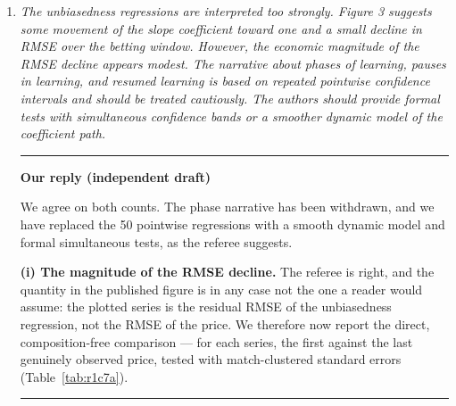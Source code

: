 \documentclass[letterpaper,12pt]{article}
\newcounter{b}
\newcommand{\Reply}[1]{\par\noindent\textbf{Reply:} #1}
\newenvironment{ourreply}
  {\par\medskip\noindent\textcolor{ourcol}{\rule{\linewidth}{1pt}}%
   \par\nobreak\vspace{3pt}%
   \noindent\textbf{\textcolor{ourcol}{Our reply (independent draft)}}%
   \par\nobreak\vspace{3pt}}
  {\par\vspace{3pt}%
   \noindent\textcolor{ourcol}{\rule{\linewidth}{0.4pt}}\par\medskip}
\begin{document}
\begin{enumerate}
\Reply{We agree that the Biais et al. (1999) framework was developed for an asymptotic, continuous, unbounded financial-market setting, whereas we apply it to a finite-horizon, binary-outcome market with irregularly spaced, margin-contaminated prices, and we will add a paragraph to Section~3.5 (Learning Rate) discussing these differences explicitly. Two features of the framework make it more portable to our setting than it may first appear. First, the moment conditions (Equation~9 in the manuscript) are constructed so that $\sigma^2$ cancels, making them robust to heteroskedasticity across time and matches -- precisely the property we need given our irregular observation grid and time-varying margins. Second, as we note following that equation, the moment conditions are invariant to a rescaling of $t$, which mitigates concerns about the arbitrary choice of a time origin in a finite-horizon market. We will clarify in the revised text that we interpret $\hat{\gamma}$ as a reduced-form measure of how quickly the price-outcome gap shrinks over our \emph{observed} window, rather than as a literal estimate of an asymptotic convergence rate, and will flag the transfer of an asymptotic framework to a finite window as an acknowledged limitation, consistent with how we already treat the comparison to Biais et al.'s and Vives's (1995) financial-market estimates as suggestive rather than directly comparable (Section~5.5).}

\item \textit{The unbiasedness regressions are interpreted too strongly. Figure 3 suggests some
movement of the slope coefficient toward one and a small decline in RMSE over the
betting window. However, the economic magnitude of the RMSE decline appears
modest. The narrative about phases of learning, pauses in learning, and resumed
learning is based on repeated pointwise confidence intervals and should be treated
cautiously. The authors should provide formal tests with simultaneous confidence
bands or a smoother dynamic model of the coefficient path. }

\begin{ourreply}
We agree on both counts. The phase narrative has been withdrawn, and we have
replaced the 50 pointwise regressions with a smooth dynamic model and formal
simultaneous tests, as the referee suggests.

\textbf{(i) The magnitude of the RMSE decline.} The referee is right, and the
quantity in the published figure is in any case not the one a reader would
assume: the plotted series is the residual RMSE of the unbiasedness
regression, not the RMSE of the price. We therefore now report the direct,
composition-free comparison --- for each series, the first against the last
genuinely observed price, tested with match-clustered standard errors
(Table~\ref{tab:r1c7a}).


\end{ourreply}
\end{enumerate}
\end{document}

